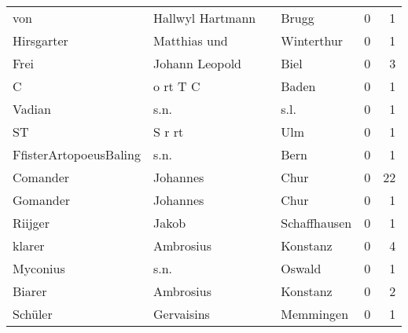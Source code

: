 \begin{center}
\begin{tiny}
\begin{longtabu}{llllrr}
                      von &                   Hallwyl Hartmann &             &                                       Brugg &          0 &         1 \\
               Hirsgarter &                       Matthias und &             &                                  Winterthur &          0 &         1 \\
                     Frei &                     Johann Leopold &             &                                        Biel &          0 &         3 \\
                        C &                           o rt T C &             &                                       Baden &          0 &         1 \\
                   Vadian &                               s.n. &             &                                        s.l. &          0 &         1 \\
                       ST &                             S r rt &             &                                         Ulm &          0 &         1 \\
   FfisterArtopoeusBaling &                               s.n. &             &                                        Bern &          0 &         1 \\
                 Comander &                           Johannes &             &                                        Chur &          0 &        22 \\
                 Gomander &                           Johannes &             &                                        Chur &          0 &         1 \\
                  Riijger &                              Jakob &             &                                Schaffhausen &          0 &         1 \\
                   klarer &                          Ambrosius &             &                                    Konstanz &          0 &         4 \\
                 Myconius &                               s.n. &             &                                      Oswald &          0 &         1 \\
                   Biarer &                          Ambrosius &             &                                    Konstanz &          0 &         2 \\
                  Schüler &                         Gervaisins &             &                                   Memmingen &          0 &         1 \\

\end{longtabu}
\end{tiny}
\end{center}
